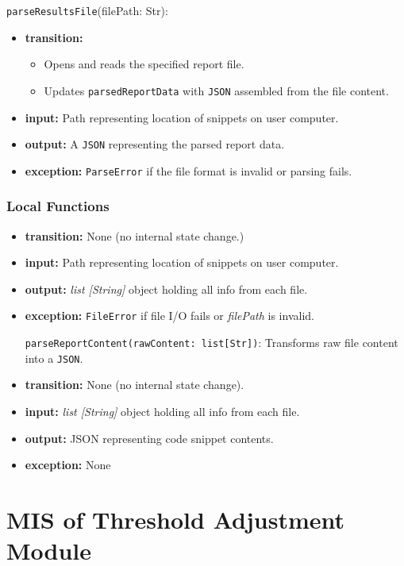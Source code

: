 \documentclass[12pt, titlepage]{article}
\begin{document}
\begin{itemize}
\noindent \texttt{parseResultsFile}(filePath: Str):
\begin{itemize}
    \item \textbf{transition:}
    \begin{itemize}
        \item Opens and reads the specified report file.
        \item Updates \texttt{parsedReportData} with \texttt{JSON} assembled from the file content.
    \end{itemize}
    \item \textbf{input:} Path representing location of snippets on user computer.
    \item \textbf{output:} A \texttt{JSON} representing the parsed report data.
    \item \textbf{exception:} \texttt{ParseError} if the file format is invalid or parsing fails.
\end{itemize}

\subsubsection{Local Functions}

\begin{itemize}
    \noindent \texttt{readLocalReportFile(path: Str)}: 
        \item \textbf{transition:} None (no internal state change.)
        \item \textbf{input:} Path representing location of snippets on user computer.
        \item \textbf{output:} \textit{list [String]} object holding all info from each file.
        \item \textbf{exception:} \texttt{FileError} if file I/O fails or \textit{filePath} is invalid.
    
    \noindent \texttt{parseReportContent(rawContent: list[Str])}: Transforms raw file content into a \texttt{JSON}.
        \item \textbf{transition:} None (no internal state change).
        \item \textbf{input:}  \textit{list [String]} object holding all info from each
        file.
        \item \textbf{output:} JSON representing code snippet contents.
        \item \textbf{exception:} None
    \end{itemize}

\section{MIS of Threshold Adjustment Module} \label{mThreshold} %


\end{itemize}
\end{document}
